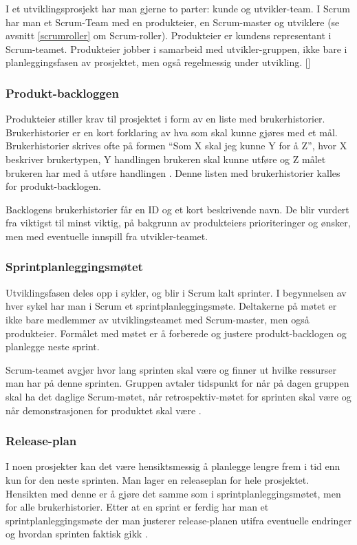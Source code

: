 \documentclass[12pt,a4paper,norsk]{article}
\begin{document}
	I et utviklingsprosjekt har man gjerne to parter: kunde og utvikler-team. I Scrum har man et Scrum-Team med en produkteier, en Scrum-master og utviklere (se avsnitt \ref{scrumroller} om Scrum-roller). Produkteier er kundens representant i Scrum-teamet. Produkteier jobber i samarbeid med utvikler-gruppen, ikke bare i planleggingsfasen av prosjektet, men også regelmessig under utvikling.
	[\cite{scrumguides}]
	\subsubsection{Produkt-backloggen}
	Produkteier stiller krav til prosjektet i form av en liste med brukerhistorier. Brukerhistorier er en kort forklaring av hva som skal kunne gjøres med et mål. Brukerhistorier skrives ofte på formen “Som X skal jeg kunne Y for å Z”, hvor X beskriver brukertypen, Y handlingen brukeren skal kunne utføre og Z målet brukeren har med å utføre handlingen \cite[side 9]{kniberg}. Denne listen med brukerhistorier kalles for produkt-backlogen.

    Backlogens brukerhistorier får en ID og et kort beskrivende navn. De blir vurdert fra viktigst til minst viktig, på bakgrunn av produkteiers prioriteringer og ønsker, men med eventuelle innspill fra utvikler-teamet.
	\subsubsection{Sprintplanleggingsmøtet}
	Utviklingsfasen deles opp i sykler, og blir i Scrum kalt sprinter. I begynnelsen av hver sykel har man i Scrum et sprintplanleggingsmøte. Deltakerne på møtet er ikke bare medlemmer av utviklingsteamet med Scrum-master, men også produkteier. Formålet med møtet er å forberede og justere produkt-backlogen og planlegge neste sprint.

    Scrum-teamet avgjør hvor lang sprinten skal være og finner ut hvilke ressurser man har på denne sprinten. Gruppen avtaler tidspunkt for når på dagen gruppen skal ha det daglige Scrum-møtet, når retrospektiv-møtet for sprinten skal være og når demonstrasjonen for produktet skal være \cite[side 16]{kniberg}.
	\subsubsection{Release-plan}
	I noen prosjekter kan det være hensiktsmessig å planlegge lengre frem i tid enn kun for den neste sprinten. Man lager en releaseplan for hele prosjektet. Hensikten med denne er å gjøre det samme som i sprintplanleggingsmøtet, men for alle brukerhistorier. Etter at en sprint er ferdig har man et sprintplanleggingsmøte der man justerer release-planen utifra eventuelle endringer og hvordan sprinten faktisk gikk \cite[side 95 - 101]{kniberg}.
\end{document}
